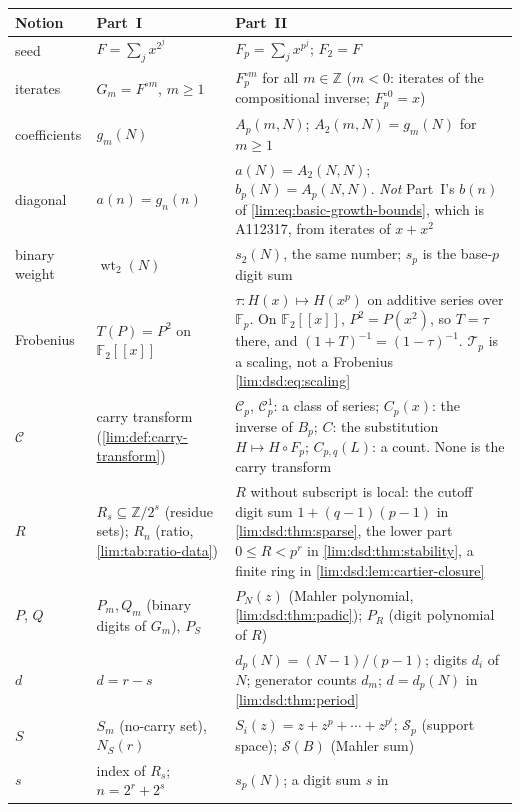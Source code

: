 \documentclass[11pt]{article}
\theoremstyle{definition}
\theoremstyle{remark}
\newcommand{\Ftwo}{\mathbb F_2}
\newcommand{\wt}{\operatorname{wt}_2}
\newcommand{\Fp}{\mathbb F_p}
\newcommand{\Cp}{\mathcal C_p}
\newcommand{\Tp}{\mathcal T_p}
\begin{document}
\begin{table}[htbp]
\centering\small
\renewcommand{\arraystretch}{1.12}
\begin{tabular}{@{}>{\raggedright\arraybackslash}p{}>{\raggedright\arraybackslash}p{}>{\raggedright\arraybackslash}p{}@{}}
\toprule
Notion & Part~I & Part~II\\
\midrule
seed & $F=\sum_jx^{2^j}$ & $F_p=\sum_jx^{p^j}$; $F_2=F$\\
iterates & $G_m=F^{\circ m}$, $m\ge1$ & $F_p^{\circ m}$ for all $m\in\mathbb Z$
($m<0$: iterates of the compositional inverse; $F_p^{\circ0}=x$)\\
coefficients & $g_m(N)$ & $A_p(m,N)$; $A_2(m,N)=g_m(N)$ for $m\ge1$\\
diagonal & $a(n)=g_n(n)$ & $a(N)=A_2(N,N)$; $b_p(N)=A_p(N,N)$. \emph{Not}
Part~I's $b(n)$ of \eqref{lim:eq:basic-growth-bounds}, which is A112317,
from iterates of $x+x^2$\\
binary weight & $\wt(N)$ & $s_2(N)$, the same number; $s_p$ is the base-$p$
digit sum\\
Frobenius & $T(P)=P^2$ on $\Ftwo[[x]]$ & $\tau\colon H(x)\mapsto H(x^p)$ on
additive series over $\Fp$. On $\Ftwo[[x]]$, $P^2=P(x^2)$, so $T=\tau$ there,
and $(1+T)^{-1}=(1-\tau)^{-1}$. $\Tp$ is a scaling, not a Frobenius
\eqref{lim:dsd:eq:scaling}\\
$\mathcal C$ & carry transform (\cref{lim:def:carry-transform}) &
$\Cp$, $\Cp^1$: a class of series; $C_p(x)$: the inverse of $B_p$;
$C$: the substitution $H\mapsto H\circ F_p$; $C_{p,q}(L)$: a count. None is
the carry transform\\
$R$ & $R_s\subseteq\mathbb Z/2^s$ (residue sets); $R_n$ (ratio,
\cref{lim:tab:ratio-data}) & $R$ without subscript is local: the cutoff
digit sum $1+(q-1)(p-1)$ in \cref{lim:dsd:thm:sparse}, the lower part
$0\le R<p^r$ in \cref{lim:dsd:thm:stability}, a finite ring in
\cref{lim:dsd:lem:cartier-closure}\\
$P$, $Q$ & $P_m,Q_m$ (binary digits of $G_m$), $P_S$ & $P_N(z)$ (Mahler
polynomial, \cref{lim:dsd:thm:padic}); $P_R$ (digit polynomial of $R$)\\
$d$ & $d=r-s$ & $d_p(N)=(N-1)/(p-1)$; digits $d_i$ of $N$; generator
counts $d_m$; $d=d_p(N)$ in \cref{lim:dsd:thm:period}\\
$S$ & $S_m$ (no-carry set), $N_S(r)$ & $S_i(z)=z+z^p+\cdots+z^{p^i}$;
$\mathscr S_p$ (support space); $\mathcal S(B)$ (Mahler sum)\\
$s$ & index of $R_s$; $n=2^r+2^s$ & $s_p(N)$; a digit sum $s$ in

\end{tabular}
\end{table}
\end{document}
